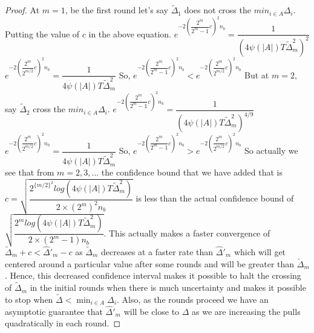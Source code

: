 \begin{proof}
At $m=1$, be the first round let's say $\tilde{\Delta}_{1}$ does not cross the $min_{i\in A}{\Delta_{i}}$. Putting the value of $c$ in the above equation.
\newline
\hspace*{8em}$e^{-2(\dfrac{2^{m}}{2^{m}-1}c)^2 n_{b}}= \dfrac{1}{({4\psi(|A|)T\tilde{\Delta}_{m}^{2}})^{2}}$
\newline
\hspace*{8em}$e^{-2(\dfrac{2^{m}}{2^{m/2}}c)^{2} n_{b}} = \dfrac{1}{{4\psi(|A|)T\tilde{\Delta}_{m}^{2}}}$
\newline
\newline
\hspace*{8em}So, $e^{-2(\dfrac{2^{m}}{2^{m}-1}c)^2 n_{b}} < e^{-2(\dfrac{2^{m}}{2^{m/2}}c)^{2} n_{b}}$
\newline
But at $m=2$, say $\tilde{\Delta}_{2}$ cross the $min_{i\in A}{\Delta_{i}}$.
\newline
\hspace*{8em}$e^{-2(\dfrac{2^{m}}{2^{m}-1}c)^2 n_{b}}= \dfrac{1}{({4\psi(|A|)T\tilde{\Delta}_{m}^{2}})^{4/9}}$
\newline
\hspace*{8em}$e^{-2(\dfrac{2^{m}}{2^{m/2}}c)^{2} n_{b}} = \dfrac{1}{{4\psi(|A|)T\tilde{\Delta}_{m}^{2}}}$
\newline
\hspace*{8em}So, $e^{-2(\dfrac{2^{m}}{2^{m}-1}c)^2 n_{b}} > e^{-2(\dfrac{2^{m}}{2^{m/2}}c)^{2} n_{b}}$
\newline
So actually we see that from $m=2,3,...$ the confidence bound that we have added that is $c=\sqrt{\dfrac{2^{\lbrace{m/2}\rbrace^{2}} log({4\psi(|A|)T\tilde{\Delta}_{m}^{2}})}{2\times(2^{m})^{2}n_{b}}}$ is less than the actual confidence bound of $\sqrt{\dfrac{2^{m} log({4\psi(|A|)T\tilde{\Delta}_{m}^{2}})}{2\times(2^{m}-1)n_{b}}}$. This actually makes a faster convergence of $\tilde{\Delta}_{m} + c < \hat{\Delta}'_{m} - c$ as $\tilde{\Delta}_{m}$ decreases at a faster rate than $\hat{\Delta}'_{m}$ which will get centered around a particular value after some rounds and will be greater than $\tilde{\Delta}_{m}$. Hence, this decreased confidence interval makes it possible to halt the crossing of $\tilde{\Delta}_{m}$ in the initial rounds when there is much uncertainty and makes it possible to stop when $\tilde{\Delta} < \min_{i\in A}{\Delta_{i}}$. Also, as the rounds proceed we have an asymptotic guarantee that $\hat{\Delta}'_{m}$ will be close to $\Delta$ as we are increasing the pulls quadratically in each round.

\end{proof}
